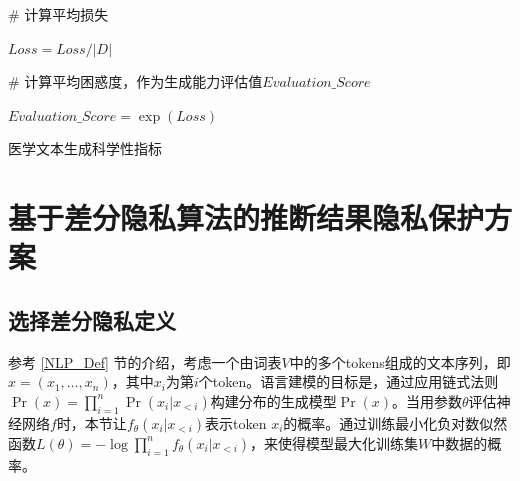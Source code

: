 \begin{algorithm}[H]
	\SetAlgoLined
	
	

	\# 计算平均损失
	
	$Loss = Loss / |D|$
	
	\# 计算平均困惑度，作为生成能力评估值$Evaluation\_Score$
	
	$Evaluation\_Score = \exp(Loss) $ %
	
	\caption{医学文本生成科学性指标}
	\label{MedicalTermEvaluation}
\end{algorithm}


\section{基于差分隐私算法的推断结果隐私保护方案}

\subsection{选择差分隐私定义}

参考 \ref{NLP_Def} 节的介绍，考虑一个由词表$V$中的多个tokens组成的文本序列，即$x=(x_1,\dots,x_n)$，其中$x_i$为第$i$个token。语言建模的目标是，通过应用链式法则$\Pr(x)=∏_{i=1}^n \Pr(x_i |x_{<i})$构建分布的生成模型$\Pr(x)$。当用参数$\theta$评估神经网络$f$时，本节让$f_\theta(x_i|x_{<i})$表示token $x_i$的概率。通过训练最小化负对数似然函数$L(θ) = -\log ∏_{i=1}^n f_θ (x_i|x_{<i})$，来使得模型最大化训练集$W$中数据的概率。

